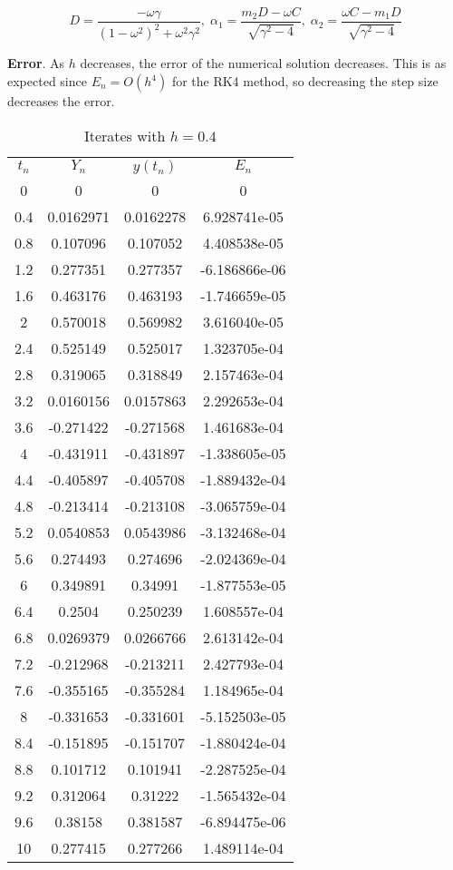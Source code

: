 \documentclass[14pt]{extarticle}
\begin{document}
\[D = \frac{-\omega \gamma}{(1 - \omega^2)^2 +\omega^2 \gamma^2},\; \alpha_1 = \frac{m_2D-\omega C}{\sqrt{\gamma^2-4}},\;\alpha_2 = \frac{\omega C-m_1D}{\sqrt{\gamma^2-4}}\]

\noindent \textbf{Error}. As $h$ decreases, the error of the numerical solution decreases. This is as expected since $E_n = O(h^4)$ for the RK4 method, so decreasing the step size decreases the error.


\begin{table}[htp!]
\caption{Iterates with $h=0.4$}
\centering
\begin{tabular}{cccc}
\\
$t_n$ & $Y_n$ & $y(t_n)$ & $E_n$ \\ [0.5ex]
   0 &          0 &          0 &    0            \\ 
 0.4 &  0.0162971 &  0.0162278 &    6.928741e-05 \\ 
 0.8 &   0.107096 &   0.107052 &    4.408538e-05 \\ 
 1.2 &   0.277351 &   0.277357 &   -6.186866e-06 \\ 
 1.6 &   0.463176 &   0.463193 &   -1.746659e-05 \\ 
   2 &   0.570018 &   0.569982 &    3.616040e-05 \\ 
 2.4 &   0.525149 &   0.525017 &    1.323705e-04 \\ 
 2.8 &   0.319065 &   0.318849 &    2.157463e-04 \\ 
 3.2 &  0.0160156 &  0.0157863 &    2.292653e-04 \\ 
 3.6 &  -0.271422 &  -0.271568 &    1.461683e-04 \\ 
   4 &  -0.431911 &  -0.431897 &   -1.338605e-05 \\ 
 4.4 &  -0.405897 &  -0.405708 &   -1.889432e-04 \\ 
 4.8 &  -0.213414 &  -0.213108 &   -3.065759e-04 \\ 
 5.2 &  0.0540853 &  0.0543986 &   -3.132468e-04 \\ 
 5.6 &   0.274493 &   0.274696 &   -2.024369e-04 \\ 
   6 &   0.349891 &    0.34991 &   -1.877553e-05 \\ 
 6.4 &     0.2504 &   0.250239 &    1.608557e-04 \\ 
 6.8 &  0.0269379 &  0.0266766 &    2.613142e-04 \\ 
 7.2 &  -0.212968 &  -0.213211 &    2.427793e-04 \\ 
 7.6 &  -0.355165 &  -0.355284 &    1.184965e-04 \\ 
   8 &  -0.331653 &  -0.331601 &   -5.152503e-05 \\ 
 8.4 &  -0.151895 &  -0.151707 &   -1.880424e-04 \\ 
 8.8 &   0.101712 &   0.101941 &   -2.287525e-04 \\ 
 9.2 &   0.312064 &    0.31222 &   -1.565432e-04 \\ 
 9.6 &    0.38158 &   0.381587 &   -6.894475e-06 \\ 
  10 &   0.277415 &   0.277266 &    1.489114e-04 \\ 
\end{tabular}
\label{table:6}
\end{table}
\end{document}
